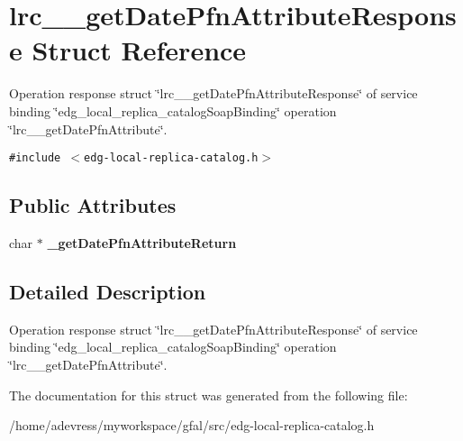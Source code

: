 \section{lrc\_\-\_\-get\-Date\-Pfn\-Attribute\-Response Struct Reference}
\label{structlrc____getDatePfnAttributeResponse}
Operation response struct \char`\"{}lrc\_\-\_\-get\-Date\-Pfn\-Attribute\-Response\char`\"{} of service binding \char`\"{}edg\_\-local\_\-replica\_\-catalog\-Soap\-Binding\char`\"{} operation \char`\"{}lrc\_\-\_\-get\-Date\-Pfn\-Attribute\char`\"{}.  


{\tt \#include $<$edg-local-replica-catalog.h$>$}

\subsection*{Public Attributes}
\begin{CompactItemize}
\item 
char $\ast$ \textbf{\_\-get\-Date\-Pfn\-Attribute\-Return}\label{structlrc____getDatePfnAttributeResponse_cfdd4fd6471f2be65970d0414242cf65}

\end{CompactItemize}


\subsection{Detailed Description}
Operation response struct \char`\"{}lrc\_\-\_\-get\-Date\-Pfn\-Attribute\-Response\char`\"{} of service binding \char`\"{}edg\_\-local\_\-replica\_\-catalog\-Soap\-Binding\char`\"{} operation \char`\"{}lrc\_\-\_\-get\-Date\-Pfn\-Attribute\char`\"{}. 



The documentation for this struct was generated from the following file:\begin{CompactItemize}
\item 
/home/adevress/myworkspace/gfal/src/edg-local-replica-catalog.h\end{CompactItemize}
